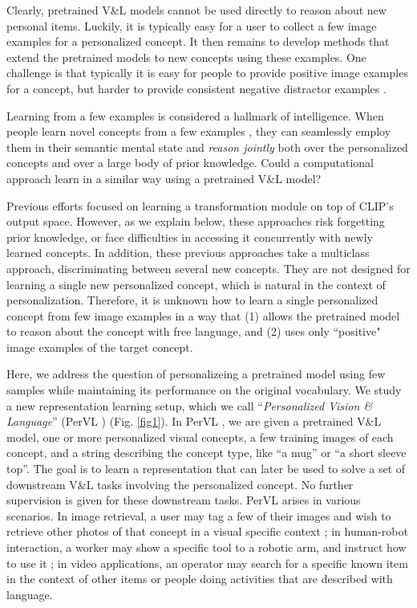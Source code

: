 \documentclass[runningheads]{llncs}
\newcommand{\figref}[1]{Fig. \ref{#1}}
\newcommand{\VL}{V\&L {}}
\newcommand{\PerVL}{PerVL {}}
\begin{document}
Clearly, pretrained \VL models cannot be used directly to reason about new personal items. 
Luckily, it is typically easy for a user to collect a few image examples for a personalized concept. It then remains to develop methods that extend the pretrained models to new concepts using these examples.
One challenge is that
typically it is easy for people to provide positive image examples for a concept, but harder to provide consistent negative distractor examples \cite{hsieh2019classification,shinoda2020binary}.

Learning from a few examples is considered a hallmark of intelligence. When people learn novel concepts from a few examples \cite{malaviya2022can,carey1978acquiring,lake2020people,markman1990constraints,markman2003use}, they can seamlessly employ them in their semantic mental state and \textit{reason jointly} both over the personalized concepts and over a large body of prior knowledge. Could a computational approach learn in a similar way using a pretrained \VL model?


Previous efforts  \cite{skantze2021collie,zhang2021tip,gao2021clip,zhou2021learning} focused on learning a transformation module on top of CLIP's output space. However, as we explain below, these approaches risk forgetting prior knowledge, or face difficulties in accessing it concurrently with newly learned concepts.
In addition, these previous approaches take a multiclass approach, discriminating between several new concepts. They are not designed for learning a single new personalized concept, which is natural in the context of personalization.
Therefore, it is unknown how to learn a single personalized concept from few image examples in a way that (1) allows the pretrained model to reason about the concept with free language, and (2) uses only ``positive" image examples of the target concept.

Here, we address the question of personalizeing a pretrained model using few samples while maintaining its performance on the original vocabulary.
We study a new representation learning setup, which we call ``\textit{Personalized Vision \& Language}'' (\PerVL\!\!)  (\figref{fig1}). In \PerVL\!\!, we are given a pretrained \VL model, one or more personalized visual concepts, a few training images of each concept, and a string describing the concept type, like ``a mug'' or ``a short sleeve top''.
The goal is to learn a representation that can later be used to solve a set of  downstream \VL tasks involving the personalized concept. No further supervision is given for these downstream tasks. \PerVL arises in various scenarios. In image retrieval, a user may tag a few of their images and wish to retrieve other photos of that concept in a visual specific context \cite{chen2020image,anwaar2021compositional}; in human-robot interaction, a worker may show a specific tool to a robotic arm, and instruct how to  use it \cite{shridhar2021cliport,wang2022hierarchical,lynch2020language}; in video applications, an operator may search for a specific known item in the context of other items or people doing activities that are described with language.
\end{document}

